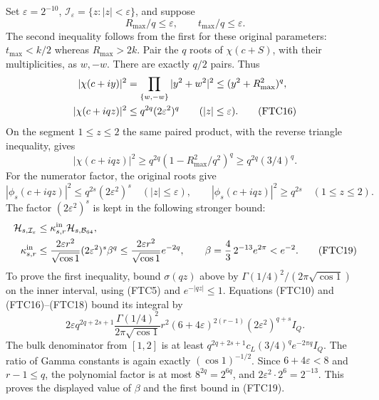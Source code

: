 \documentclass[11pt,a4paper]{article}
\begin{document}
Set $\varepsilon=2^{-10}$, $\mathcal I_\varepsilon=\{z:|z|<\varepsilon\}$,
and suppose
\begin{equation}
 R_{\max}/q\le\varepsilon,\qquad t_{\max}/q\le\varepsilon.
 \tag{FTC15}
\end{equation}
The second inequality follows from the first for these original parameters:
$t_{\max}<k/2$ whereas $R_{\max}>2k$.
Pair the $q$ roots of $\chi(c+S)$, with their multiplicities, as $w,-w$.
There are exactly $q/2$ pairs.  Thus
\begin{align}
 |\chi(c+iy)|^2
 &=\prod_{\{w,-w\}}|y^2+w^2|^2
 \le(y^2+R_{\max}^2)^q,\notag\\
 |\chi(c+iqz)|^2
 &\le q^{2q}(2\varepsilon^2)^q
 \qquad (|z|\le\varepsilon).
 \tag{FTC16}
\end{align}
On the segment $1\le z\le2$ the same paired product, with the reverse
triangle inequality, gives
\begin{equation}
 |\chi(c+iqz)|^2
 \ge q^{2q}(1-R_{\max}^2/q^2)^q
 \ge q^{2q}(3/4)^q.
 \tag{FTC17}
\end{equation}
For the numerator factor, the original roots give
\begin{equation}
 |\phi_s(c+iqz)|^2\le q^{2s}(2\varepsilon^2)^s
 \quad (|z|\le\varepsilon),\qquad
 |\phi_s(c+iqz)|^2\ge q^{2s}
 \quad (1\le z\le2).
 \tag{FTC18}
\end{equation}
The factor $(2\varepsilon^2)^s$ is kept in the following stronger bound:
\begin{align}
 \mathcal H_{s,\mathcal I_\varepsilon}
 &\le\kappa_{s,r}^{\mathrm{in}}\mathcal H_{s,\mathcal B_{64}},\notag\\
 \kappa_{s,r}^{\mathrm{in}}
 &\le\frac{2\varepsilon r^2}{\sqrt{\cos1}}
 (2\varepsilon^2)^s\beta^q
 \le\frac{2\varepsilon r^2}{\sqrt{\cos1}}e^{-2q},
 \qquad \beta=\frac43\,2^{-13}e^{2\pi}<e^{-2}.
 \tag{FTC19}
\end{align}
To prove the first inequality, bound $\sigma(qz)$ above by
$\Gamma(1/4)^2/(2\pi\sqrt{\cos1})$ on the inner interval, using (FTC5)
and $e^{-|qz|}\le1$.  Equations (FTC10) and (FTC16)--(FTC18) bound its
integral by
\[
 2\varepsilon q^{2q+2s+1}
 \frac{\Gamma(1/4)^2}{2\pi\sqrt{\cos1}}
 r^2(6+4\varepsilon)^{2(r-1)}
 (2\varepsilon^2)^{q+s}I_Q.
\]
The bulk denominator from $[1,2]$ is at least
$q^{2q+2s+1}c_L(3/4)^qe^{-2\pi q}I_Q$.
The ratio of Gamma constants is again exactly $(\cos1)^{-1/2}$.
Since $6+4\varepsilon<8$ and $r-1\le q$, the polynomial factor is at
most $8^{2q}=2^{6q}$, and
$2\varepsilon^2\cdot2^6=2^{-13}$.  This proves the displayed value of
$\beta$ and the first bound in (FTC19).
\end{document}
